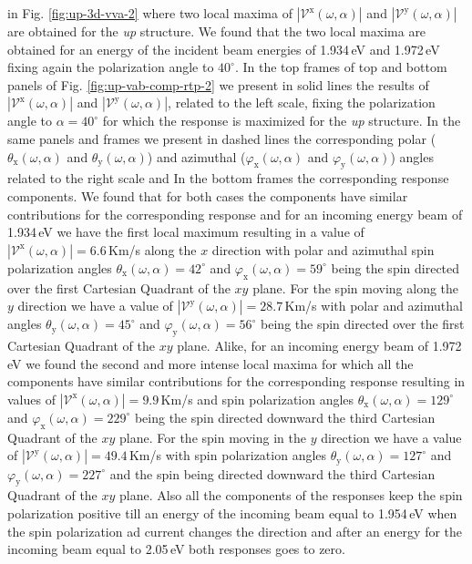 \documentclass[prb,11pt,tightenlines,twocolumn,aps]{revtex4-1}
\begin{document}
in Fig. \ref{fig:up-3d-vva-2} where two local maxima of
$|\mathcal{V}^{\mathrm{x}}(\omega,\alpha)|$ and
$|\mathcal{V}^{\mathrm{y}}(\omega,\alpha)|$ are obtained for the \emph{up}
structure.
% 
We found that the two local maxima are obtained for an energy of the incident
beam energies of 1.934\,eV and 1.972\,eV fixing again the polarization angle to
$40^{\circ}$. 
In the top frames of top and bottom panels of Fig. \ref{fig:up-vab-comp-rtp-2}
we present in solid lines the results of
$|\mathcal{V}^{\mathrm{x}}(\omega,\alpha)|$ and
$|\mathcal{V}^{\mathrm{y}}(\omega,\alpha)|$, related to the left scale, fixing
the polarization angle to $\alpha=40^{\circ}$ for which the response is
maximized for the \emph{up} structure. In the same panels and frames we present
in dashed lines the corresponding polar ($\theta_{\mathrm{x}}(\omega,\alpha)$
and $\theta_{\mathrm{y}}(\omega,\alpha)$) and azimuthal
($\varphi_{\mathrm{x}}(\omega,\alpha)$ and
$\varphi_{\mathrm{y}}(\omega,\alpha)$) angles related to the right scale and  In
the bottom frames the corresponding response components.
% 
We found that for both cases the components have similar contributions for the
corresponding response and for an incoming energy beam of 1.934\,eV  we have the
first local maximum resulting in a value of
$|\mathcal{V}^{\mathrm{x}}(\omega,\alpha)|= 6.6$\,Km/s along the $x$ direction
with polar and azimuthal spin polarization angles
$\theta_{\mathrm{x}}(\omega,\alpha)= 42^{\circ}$ and
$\varphi_{\mathrm{x}}(\omega,\alpha)=59^{\circ}$ being the spin directed over
the first Cartesian Quadrant of the $xy$ plane.
% 
For the spin moving along the $y$ direction we have a value of
$|\mathcal{V}^{\mathrm{y}}(\omega,\alpha)|=28.7$\,Km/s with polar and azimuthal
angles $\theta_{\mathrm{y}}(\omega,\alpha)=45^{\circ}$ and
$\varphi_{\mathrm{y}}(\omega,\alpha)=56^{\circ}$ being  the spin directed over
the first Cartesian Quadrant of the $xy$ plane.
% 
Alike, for an incoming energy beam of 1.972\,eV we found the second and more
intense local maxima for which all the components have similar contributions for
the corresponding response resulting in values of
$|\mathcal{V}^{\mathrm{x}}(\omega,\alpha)|=9.9$\,Km/s and spin polarization
angles $\theta_{\mathrm{x}}(\omega,\alpha)=129^{\circ}$ and
$\varphi_{\mathrm{x}}(\omega,\alpha)=229^{\circ}$ being the spin directed
downward the third Cartesian Quadrant of the $xy$ plane.
% 
For the spin moving in the $y$ direction we have a value of
$|\mathcal{V}^{\mathrm{y}}(\omega,\alpha)|=49.4$\,Km/s with spin polarization
angles $\theta_{\mathrm{y}}(\omega,\alpha)=127^{\circ}$ and
$\varphi_{\mathrm{y}}(\omega,\alpha)=227^{\circ}$ and the spin being
directed downward the third Cartesian Quadrant of the $xy$ plane.
% 
Also all the components of the responses keep the spin polarization positive
till an energy of the incoming beam equal to 1.954\,eV when the spin
polarization ad current changes the direction and after an energy for the
incoming beam equal to 2.05\,eV both responses goes to zero.
\end{document}
